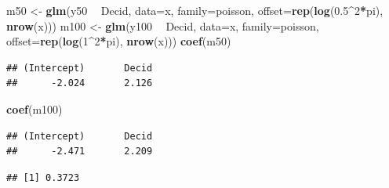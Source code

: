 \documentclass[12pt,]{book}
\newenvironment{Shaded}{\begin{snugshade}}{\end{snugshade}}
\newcommand{\DataTypeTok}[1]{\textcolor[rgb]{0.13,0.29,0.53}{#1}}
\newcommand{\DecValTok}[1]{\textcolor[rgb]{0.00,0.00,0.81}{#1}}
\newcommand{\FloatTok}[1]{\textcolor[rgb]{0.00,0.00,0.81}{#1}}
\newcommand{\KeywordTok}[1]{\textcolor[rgb]{0.13,0.29,0.53}{\textbf{#1}}}
\newcommand{\NormalTok}[1]{#1}
\newcommand{\OperatorTok}[1]{\textcolor[rgb]{0.81,0.36,0.00}{\textbf{#1}}}
\newcommand{\StringTok}[1]{\textcolor[rgb]{0.31,0.60,0.02}{#1}}
\begin{document}
\begin{Shaded}
\begin{Highlighting}[]
\NormalTok{m50 <-}\StringTok{ }\KeywordTok{glm}\NormalTok{(y50 }\OperatorTok{~}\StringTok{ }\NormalTok{Decid, }\DataTypeTok{data=}\NormalTok{x, }\DataTypeTok{family=}\NormalTok{poisson, }
  \DataTypeTok{offset=}\KeywordTok{rep}\NormalTok{(}\KeywordTok{log}\NormalTok{(}\FloatTok{0.5}\OperatorTok{^}\DecValTok{2}\OperatorTok{*}\NormalTok{pi), }\KeywordTok{nrow}\NormalTok{(x)))}
\NormalTok{m100 <-}\StringTok{ }\KeywordTok{glm}\NormalTok{(y100 }\OperatorTok{~}\StringTok{ }\NormalTok{Decid, }\DataTypeTok{data=}\NormalTok{x, }\DataTypeTok{family=}\NormalTok{poisson,}
  \DataTypeTok{offset=}\KeywordTok{rep}\NormalTok{(}\KeywordTok{log}\NormalTok{(}\DecValTok{1}\OperatorTok{^}\DecValTok{2}\OperatorTok{*}\NormalTok{pi), }\KeywordTok{nrow}\NormalTok{(x)))}
\KeywordTok{coef}\NormalTok{(m50)}
\end{Highlighting}
\end{Shaded}

\begin{verbatim}
## (Intercept)       Decid 
##      -2.024       2.126
\end{verbatim}

\begin{Shaded}
\begin{Highlighting}[]
\KeywordTok{coef}\NormalTok{(m100)}
\end{Highlighting}
\end{Shaded}

\begin{verbatim}
## (Intercept)       Decid 
##      -2.471       2.209
\end{verbatim}

\begin{Shaded}
\end{Shaded}

\begin{verbatim}
## [1] 0.3723
\end{verbatim}

\begin{Shaded}
\end{Shaded}
\end{document}

